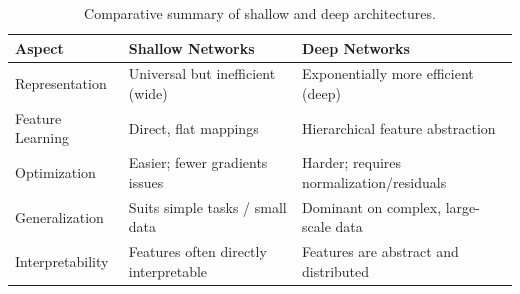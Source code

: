 \begin{table}[ht]
  \centering
  \small
  \caption{Comparative summary of shallow and deep architectures.}
  \label{tab:shallow_vs_deep}
  \begin{tabular}{@{}lp{5cm}p{5.5cm}@{}}
    \toprule
    \textbf{Aspect} & \textbf{Shallow Networks} & \textbf{Deep Networks} \\
    \midrule
    Representation & Universal but inefficient (wide) & Exponentially more efficient (deep) \\
    Feature Learning & Direct, flat mappings & Hierarchical feature abstraction \\
    Optimization & Easier; fewer gradients issues & Harder; requires normalization/residuals \\
    Generalization & Suits simple tasks / small data & Dominant on complex, large-scale data \\
    Interpretability & Features often directly interpretable & Features are abstract and distributed \\
    \bottomrule
  \end{tabular}
\end{table}
